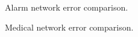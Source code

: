 \documentclass[11pt]{article}
\begin{document}
	\begin{figure}[H]
		\caption{Alarm network error comparison.}
		\label{fig:error_alarm}
	\end{figure}
	\begin{figure}[H]
		\caption{Medical network error comparison.}
	\label{fig:error_medical}
\end{figure}
\end{document}

